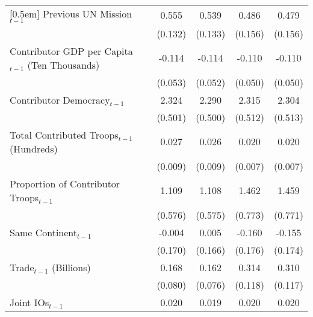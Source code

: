\begin{table}[htbp]
\begin{tabular}{l*{5}{c}}
[0.5em]
Previous UN Mission$_{t-1}$ &                    &       0.555\sym{**}&       0.539\sym{**}&       0.486\sym{**}&       0.479\sym{**}\\
                    &                    &     (0.132)        &     (0.133)        &     (0.156)        &     (0.156)        \\
[0.5em]
Contributor GDP per Capita$_{t-1}$ (Ten Thousands)&                    &      -0.114\sym{*} &      -0.114\sym{*} &      -0.110\sym{*} &      -0.110\sym{*} \\
                    &                    &     (0.053)        &     (0.052)        &     (0.050)        &     (0.050)        \\
[0.5em]
Contributor Democracy$_{t-1}$&                    &       2.324\sym{**}&       2.290\sym{**}&       2.315\sym{**}&       2.304\sym{**}\\
                    &                    &     (0.501)        &     (0.500)        &     (0.512)        &     (0.513)        \\
[0.5em]
Total Contributed Troops$_{t-1}$ (Hundreds)&                    &       0.027\sym{**}&       0.026\sym{**}&       0.020\sym{**}&       0.020\sym{**}\\
                    &                    &     (0.009)        &     (0.009)        &     (0.007)        &     (0.007)        \\
[0.5em]
Proportion of Contributor Troops$_{t-1}$&                    &       1.109\sym{\dagger} &       1.108\sym{\dagger} &       1.462\sym{\dagger} &       1.459\sym{\dagger} \\
                    &                    &     (0.576)        &     (0.575)        &     (0.773)        &     (0.771)        \\
[0.5em]
Same Continent$_{t-1}$      &                    &      -0.004        &       0.005        &      -0.160        &      -0.155        \\
                    &                    &     (0.170)        &     (0.166)        &     (0.176)        &     (0.174)        \\
[0.5em]
Trade$_{t-1}$ (Billions)    &                    &       0.168\sym{*} &       0.162\sym{*} &       0.314\sym{**}&       0.310\sym{**}\\
                    &                    &     (0.080)        &     (0.076)        &     (0.118)        &     (0.117)        \\
[0.5em]
Joint IOs$_{t-1}$           &                    &       0.020\sym{**}&       0.019\sym{**}&       0.020\sym{**}&       0.020\sym{**}\\

\end{tabular}
\end{table}
